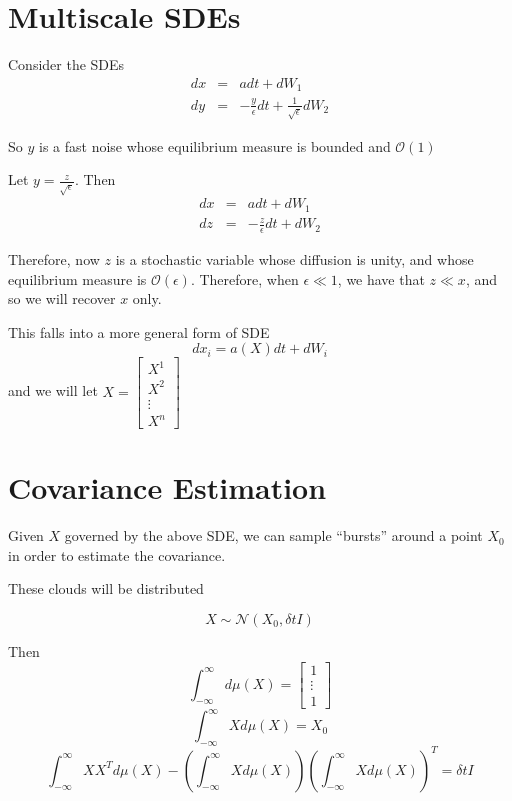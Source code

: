 \documentclass[12pt]{article}
\begin{document}
\section{Multiscale SDEs}

Consider the SDEs
\begin{eqnarray}
dx &=& adt + dW_1\\
dy &=& -\frac{y}{\epsilon} dt + \frac{1}{\sqrt{\epsilon}} dW_2
\end{eqnarray}

So $y$ is a fast noise whose equilibrium measure is bounded and $\mathcal{O}(1)$

Let $y = \frac{z}{\sqrt{\epsilon}}$. Then
\begin{eqnarray}
dx &=& adt + dW_1\\
dz &=& -\frac{z}{\epsilon} dt +  dW_2
\end{eqnarray}

Therefore, now $z$ is a stochastic variable whose diffusion is unity, and whose equilibrium measure is $\mathcal{O}(\epsilon)$. 
%
Therefore, when $\epsilon \ll 1$, we have that $z \ll x$, and so we will recover $x$ only.

This falls into a more general form of SDE
\begin{equation}
dx_i = a(X) dt + dW_i
\end{equation}
and we will let $X = \begin{bmatrix} X^1 \\ X^2 \\ \vdots \\ X^n \end{bmatrix}$

\section{Covariance Estimation}

Given $X$ governed by the above SDE, we can sample ``bursts'' around a point $X_0$ in order to estimate the covariance. 

These clouds will be distributed 

\begin{equation}
X \sim \mathcal{N}\left( X_0, \delta t I \right)
\end{equation}

Then
$$\int_{-\infty}^{\infty} d\mu(X) = \begin{bmatrix} 1 \\ \vdots \\ 1\end{bmatrix}$$
$$\int_{-\infty}^{\infty} X d\mu(X) = X_0$$
$$\int_{-\infty}^{\infty} X X^T d\mu(X) - \left( \int_{-\infty}^{\infty} X d\mu(X) \right) \left( \int_{-\infty}^{\infty} X d\mu(X) \right)^T = \delta t I$$
\end{document}
